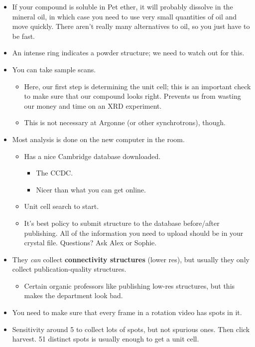 \documentclass[../notes.tex]{subfiles}
\begin{document}
\begin{itemize}
    \item If your compound is soluble in Pet ether, it will probably dissolve in the mineral oil, in which case you need to use very small quantities of oil and move quickly. There aren't really many alternatives to oil, so you just have to be fast.
    \item An intense ring indicates a powder structure; we need to watch out for this.
    \item You can take sample scans.
    \begin{itemize}
        \item Here, our first step is determining the unit cell; this is an important check to make sure that our compound looks right. Prevents us from wasting our money and time on an XRD experiment.
        \item This is not necessary at Argonne (or other synchrotrons), though.
    \end{itemize}
    \item Most analysis is done on the new computer in the room.
    \begin{itemize}
        \item Has a nice Cambridge database downloaded.
        \begin{itemize}
            \item The CCDC.
            \item Nicer than what you can get online.
        \end{itemize}
        \item Unit cell search to start.
        \item It's best policy to submit structure to the database before/after publishing. All of the information you need to upload should be in your crystal file. Questions? Ask Alex or Sophie.
    \end{itemize}
    \item They \emph{can} collect \textbf{connectivity structures} (lower res), but usually they only collect publication-quality structures.
    \begin{itemize}
        \item Certain organic professors like publishing low-res structures, but this makes the department look bad.
    \end{itemize}
    \item You need to make sure that every frame in a rotation video has spots in it.
    \item Sensitivity around 5 to collect lots of spots, but not spurious ones. Then click harvest. 51 distinct spots is usually enough to get a unit cell.

\end{itemize}
\end{document}
